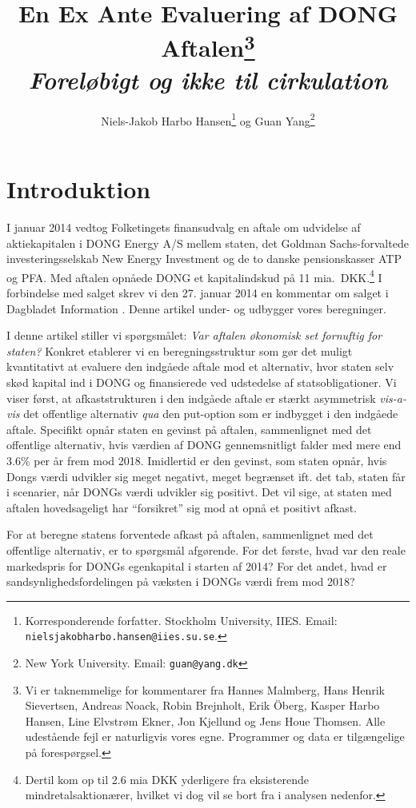 \documentclass{article}
\title{En Ex Ante Evaluering af DONG Aftalen\thanks{Vi er taknemmelige for kommentarer fra Hannes Malmberg, Hans Henrik Sievertsen, Andreas Noack, Robin Brejnholt, Erik {\"O}berg, Kasper Harbo Hansen, Line Elvstrøm Ekner, Jon Kjellund og Jens Houe Thomsen. Alle udestående fejl er naturligvis vores egne.  Programmer og data er tilgængelige på forespørgsel.} \\ \emph{Foreløbigt og ikke til cirkulation}}
\author{Niels-Jakob Harbo Hansen\thanks{Korresponderende forfatter. Stockholm University, IIES.  Email: \texttt{nielsjakobharbo.hansen@iies.su.se}. } \hspace{0.1 mm} og Guan Yang\thanks{New York University.  Email: \texttt{guan@yang.dk}}}
\begin{document}
\maketitle

\newpage

\section{Introduktion}


I januar 2014 vedtog Folketingets finansudvalg en aftale om udvidelse af aktiekapitalen i DONG Energy A/S mellem staten, det Goldman Sachs-forvaltede investeringsselskab New Energy Investment og de to danske pensionskasser ATP og PFA\@. Med aftalen opnåede DONG et kapitalindskud på 11 mia.\ DKK.\footnote{Dertil kom op til 2.6 mia DKK yderligere fra eksisterende mindretalsaktionærer, hvilket vi dog vil se bort fra i analysen nedenfor.} I forbindelse med salget skrev vi den 27. januar 2014 en kommentar om salget i Dagbladet Information \citep{Hansen2014}. Denne artikel under- og udbygger vores beregninger.

I denne artikel stiller vi spørgsmålet: \emph{Var aftalen økonomisk set fornuftig for staten?} Konkret etablerer vi en beregningsstruktur som gør det muligt kvantitativt at evaluere den indgåede aftale mod et alternativ, hvor staten selv skød kapital ind i DONG og finansierede ved udstedelse af statsobligationer. Vi viser først, at afkaststrukturen i den indgåede aftale er stærkt asymmetrisk \emph{vis-a-vis} det offentlige alternativ \emph{qua} den put-option som er indbygget i den indgåede aftale. Specifikt opnår staten en gevinst på aftalen, sammenlignet med det offentlige alternativ, hvis værdien af DONG gennemsnitligt falder med mere end 3.6\% per år frem mod 2018. Imidlertid er den gevinst, som staten opnår, hvis Dongs værdi udvikler sig meget negativt, meget begrænset ift. det tab, staten får i scenarier, når DONGs værdi udvikler sig positivt. Det vil sige, at staten med aftalen hovedsageligt har \enquote{forsikret} sig mod at opnå et positivt afkast. 

For at beregne statens forventede afkast på aftalen, sammenlignet med det offentlige alternativ, er to spørgsmål afgørende. For det første, hvad var den reale markedspris for DONGs egenkapital i starten af 2014? For det andet, hvad er sandsynlighedsfordelingen på væksten i DONGs værdi frem mod 2018? 
\end{document}
